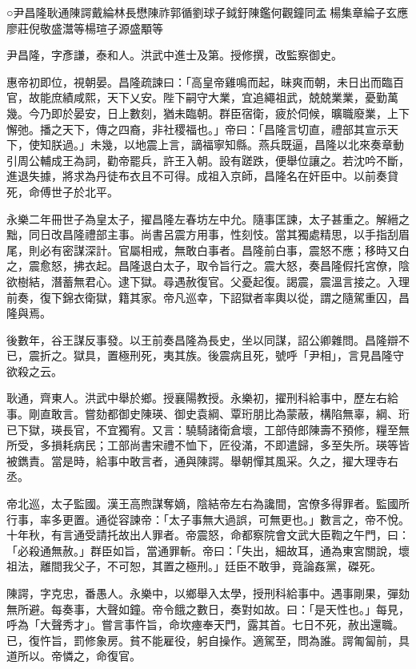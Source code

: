 
\begin{pinyinscope}
○尹昌隆耿通陳諤戴綸林長懋陳祚郭循劉球子鉞釪陳鑑何觀鐘同孟楊集章綸子玄應廖莊倪敬盛灊等楊瑄子源盛顒等

尹昌隆，字彥謙，泰和人。洪武中進士及第。授修撰，改監察御史。

惠帝初即位，視朝晏。昌隆疏諫曰：「高皇帝雞鳴而起，昧爽而朝，未日出而臨百官，故能庶績咸熙，天下乂安。陛下嗣守大業，宜追繩祖武，兢兢業業，憂勤萬幾。今乃即於晏安，日上數刻，猶未臨朝。群臣宿衛，疲於伺候，曠職廢業，上下懈弛。播之天下，傳之四裔，非社稷福也。」帝曰：「昌隆言切直，禮部其宣示天下，使知朕過。」未幾，以地震上言，謫福寧知縣。燕兵既逼，昌隆以北來奏章動引周公輔成王為詞，勸帝罷兵，許王入朝。設有蹉跌，便舉位讓之。若沈吟不斷，進退失據，將求為丹徒布衣且不可得。成祖入京師，昌隆名在奸臣中。以前奏貸死，命傅世子於北平。

永樂二年冊世子為皇太子，擢昌隆左春坊左中允。隨事匡諫，太子甚重之。解縉之黜，同日改昌隆禮部主事。尚書呂震方用事，性刻忮。當其獨處精思，以手指刮眉尾，則必有密謀深計。官屬相戒，無敢白事者。昌隆前白事，震怒不應；移時又白之，震愈怒，拂衣起。昌隆退白太子，取令旨行之。震大怒，奏昌隆假托宮僚，陰欲樹結，潛蓄無君心。逮下獄。尋遇赦復官。父憂起復。謁震，震溫言接之。入理前奏，復下錦衣衛獄，籍其家。帝凡巡幸，下詔獄者率輿以從，謂之隨駕重囚，昌隆與焉。

後數年，谷王謀反事發。以王前奏昌隆為長史，坐以同謀，詔公卿雜問。昌隆辯不已，震折之。獄具，置極刑死，夷其族。後震病且死，號呼「尹相」，言見昌隆守欲殺之云。

耿通，齊東人。洪武中舉於鄉。授襄陽教授。永樂初，擢刑科給事中，歷左右給事。剛直敢言。嘗劾都御史陳瑛、御史袁綱、覃珩朋比為蒙蔽，構陷無辜，綱、珩已下獄，瑛長官，不宜獨宥。又言：驍騎諸衛倉壞，工部侍郎陳壽不預修，糧至無所受，多損耗病民；工部尚書宋禮不恤下，匠役滿，不即遣歸，多至失所。瑛等皆被鐫責。當是時，給事中敢言者，通與陳諤。舉朝憚其風采。久之，擢大理寺右丞。

帝北巡，太子監國。漢王高煦謀奪嫡，陰結帝左右為讒間，宮僚多得罪者。監國所行事，率多更置。通從容諫帝：「太子事無大過誤，可無更也。」數言之，帝不悅。十年秋，有言通受請托故出人罪者。帝震怒，命都察院會文武大臣鞫之午門，曰：「必殺通無赦。」群臣如旨，當通罪斬。帝曰：「失出，細故耳，通為東宮關說，壞祖法，離間我父子，不可恕，其置之極刑。」廷臣不敢爭，竟論姦黨，磔死。

陳諤，字克忠，番愚人。永樂中，以鄉舉入太學，授刑科給事中。遇事剛果，彈劾無所避。每奏事，大聲如鐘。帝令餓之數日，奏對如故。曰：「是天性也。」每見，呼為「大聲秀才」。嘗言事忤旨，命坎瘞奉天門，露其首。七日不死，赦出還職。已，復忤旨，罰修象房。貧不能雇役，躬自操作。適駕至，問為誰。諤匍匐前，具道所以。帝憐之，命復官。


\end{pinyinscope}
